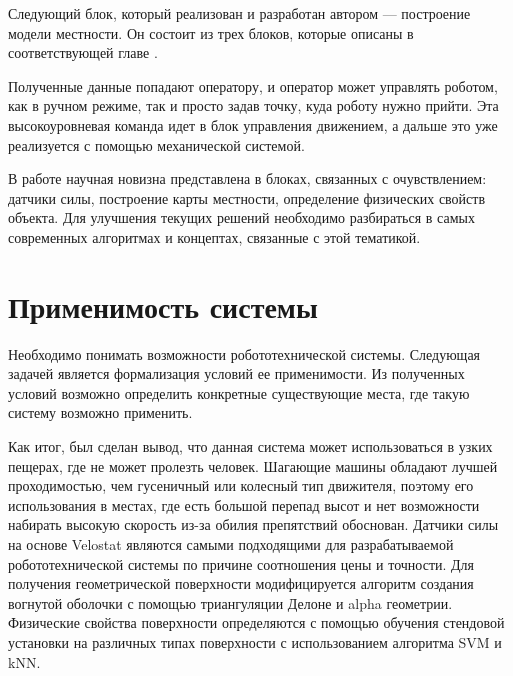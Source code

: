 Следующий блок, который реализован и разработан автором --- построение модели местности. Он состоит из трех блоков, которые описаны в соответствующей главе .

Полученные данные попадают оператору, и оператор может управлять роботом, как в ручном режиме, так и просто задав точку, куда роботу нужно прийти. Эта высокоуровневая команда идет в блок управления движением, а дальше это уже реализуется с помощью механической системой.

В работе научная новизна представлена в блоках, связанных с очувствлением: датчики силы, построение карты местности, определение физических свойств объекта. Для улучшения текущих решений необходимо разбираться в самых современных алгоритмах и концептах, связанные с этой тематикой.

\section{Применимость системы}
Необходимо понимать возможности робототехнической системы. Следующая задачей является формализация условий ее применимости. Из полученных условий возможно определить конкретные существующие места, где такую систему возможно применить.

Как итог, был сделан вывод, что данная система может использоваться в узких пещерах, где не может пролезть человек. Шагающие машины обладают лучшей проходимостью, чем гусеничный или колесный тип движителя, поэтому его использования в местах, где есть большой перепад высот и нет возможности набирать высокую скорость из-за обилия препятствий обоснован. Датчики силы на основе Velostat являются самыми подходящими для разрабатываемой робототехнической системы по причине соотношения цены и точности. Для получения геометрической поверхности модифицируется алгоритм создания вогнутой оболочки с помощью триангуляции Делоне и alpha геометрии. Физические свойства поверхности определяются с помощью обучения стендовой установки на различных типах поверхности с использованием алгоритма SVM и kNN.